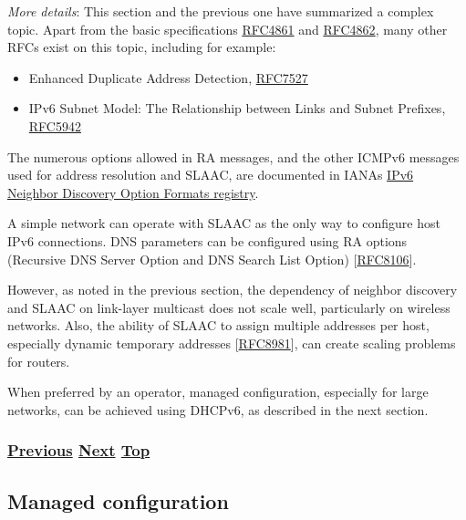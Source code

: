 \documentclass[
]{article}
\begin{document}
\emph{More details}: This section and the previous one have summarized a
complex topic. Apart from the basic specifications
\href{https://www.rfc-editor.org/info/rfc4861}{RFC4861} and
\href{https://www.rfc-editor.org/info/rfc4862}{RFC4862}, many other RFCs
exist on this topic, including for example:

\begin{itemize}
\item
  Enhanced Duplicate Address Detection,
  \href{https://www.rfc-editor.org/info/rfc7527}{RFC7527}
\item
  IPv6 Subnet Model: The Relationship between Links and Subnet Prefixes,
  \href{https://www.rfc-editor.org/info/rfc5942}{RFC5942}
\end{itemize}

The numerous options allowed in RA messages, and the other ICMPv6
messages used for address resolution and SLAAC, are documented in
IANA\textquotesingle s
\href{https://www.iana.org/assignments/icmpv6-parameters/icmpv6-parameters.xhtml\#icmpv6-parameters-5}{IPv6
Neighbor Discovery Option Formats registry}.

A simple network can operate with SLAAC as the only way to configure
host IPv6 connections. DNS parameters can be configured using RA options
(Recursive DNS Server Option and DNS Search List Option)
{[}\href{https://www.rfc-editor.org/info/rfc8106}{RFC8106}{]}.

However, as noted in the previous section, the dependency of neighbor
discovery and SLAAC on link-layer multicast does not scale well,
particularly on wireless networks. Also, the ability of SLAAC to assign
multiple addresses per host, especially dynamic temporary addresses
{[}\href{https://www.rfc-editor.org/info/rfc8981}{RFC8981}{]}, can
create scaling problems for routers.

When preferred by an operator, managed configuration, especially for
large networks, can be achieved using DHCPv6, as described in the next
section.

\subsubsection{\texorpdfstring{\hyperref[address-resolution]{Previous}
\hyperref[managed-configuration]{Next}
\hyperref[ipv6-basic-technology]{Top}}{Previous Next Top}}\label{previous-next-top-10}

\pagebreak

\subsection{Managed configuration}\label{managed-configuration}
\end{document}

